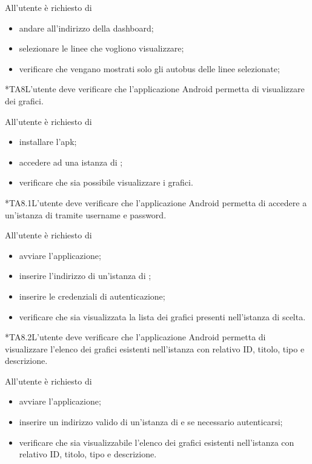		All'utente è richiesto di
		\begin{itemize}
			\item andare all'indirizzo della dashboard;
			\item selezionare le linee che vogliono visualizzare;
			\item verificare che vengano mostrati solo gli autobus delle linee selezionate;
		\end{itemize}

	*{TA8}L'utente deve verificare che l'applicazione Android permetta di visualizzare dei grafici.

		All'utente è richiesto di
		\begin{itemize}
			\item installare l'apk;
			\item accedere ad una istanza di \projectname{};
			\item verificare che sia possibile visualizzare i grafici.
		\end{itemize}

	*{TA8.1}L'utente deve verificare che l'applicazione Android permetta di accedere a un'istanza di \projectname{} tramite username e password.

		All'utente è richiesto di
		\begin{itemize}
			\item avviare l'applicazione;
			\item inserire l'indirizzo di un'istanza di \projectname{};
			\item inserire le credenziali di autenticazione;
			\item verificare che sia visualizzata la lista dei grafici presenti nell'istanza di \projectname{} scelta.
		\end{itemize}

	*{TA8.2}L'utente deve verificare che l'applicazione Android permetta di visualizzare l'elenco dei grafici esistenti nell'istanza \projectname{} con relativo ID, titolo, tipo e descrizione.

		All'utente è richiesto di
		\begin{itemize}
			\item avviare l'applicazione;
			\item inserire un indirizzo valido di un'istanza di \projectname{} e se necessario autenticarsi;
			\item verificare che sia visualizzabile l'elenco dei grafici esistenti nell'istanza \projectname{} con relativo ID, titolo, tipo e descrizione.
		\end{itemize}

